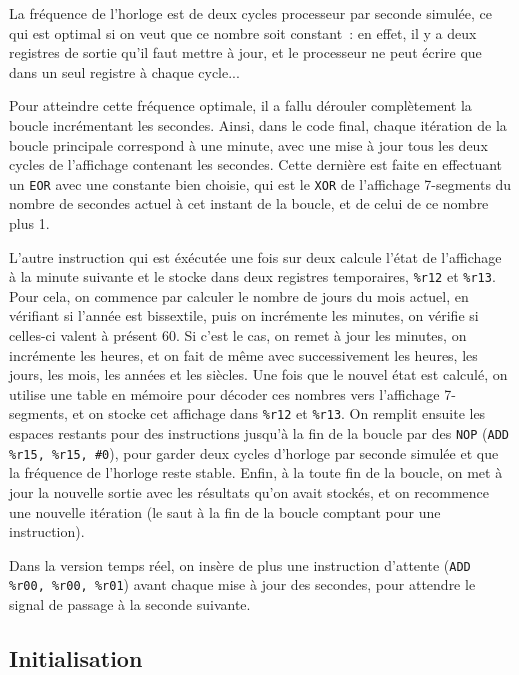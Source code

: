 \documentclass[11pt,a4paper]{article}
\begin{document}
La fréquence de l'horloge est de deux cycles processeur par seconde
simulée, ce qui est optimal si on veut que ce nombre soit constant~:
en effet, il y a deux registres de sortie qu'il faut mettre à jour, et
le processeur ne peut écrire que dans un seul registre à chaque cycle...

Pour atteindre cette fréquence optimale, il a fallu dérouler
complètement la boucle incrémentant les secondes. Ainsi, dans le code
final, chaque itération de la boucle principale correspond à une
minute, avec une mise à jour tous les deux cycles de l'affichage
contenant les secondes. Cette dernière est faite en effectuant un
\verb!EOR! avec une constante bien choisie, qui est le \verb!XOR! de
l'affichage 7-segments du nombre de secondes actuel à cet instant de
la boucle, et de celui de ce nombre plus 1.

L'autre instruction qui est éxécutée une fois sur deux calcule l'état
de l'affichage à la minute suivante et le stocke dans deux registres
temporaires, \verb!%r12! et \verb!%r13!. Pour cela, on commence par
calculer le nombre de jours du mois actuel, en vérifiant si l'année
est bissextile, puis on incrémente les minutes, on vérifie si
celles-ci valent à présent 60. Si c'est le cas, on remet à jour les
minutes, on incrémente les heures, et on fait de même avec
successivement les heures, les jours, les mois, les années et les
siècles. Une fois que le nouvel état est calculé, on utilise une table
en mémoire pour décoder ces nombres vers l'affichage 7-segments, et on
stocke cet affichage dans \verb!%r12! et \verb!%r13!. On remplit
ensuite les espaces restants pour des instructions jusqu'à la fin de
la boucle par des \verb!NOP! (\verb!ADD %r15, %r15, #0!), pour garder
deux cycles d'horloge par seconde simulée et que la fréquence de
l'horloge reste stable. Enfin, à la toute fin de la boucle, on met à
jour la nouvelle sortie avec les résultats qu'on avait stockés, et on
recommence une nouvelle itération (le saut à la fin de la boucle
comptant pour une instruction).

Dans la version temps réel, on insère de plus une instruction
d'attente (\verb!ADD %r00, %r00, %r01!) avant chaque mise à jour des
secondes, pour attendre le signal de passage à la seconde suivante.

\subsection{Initialisation}
\end{document}
